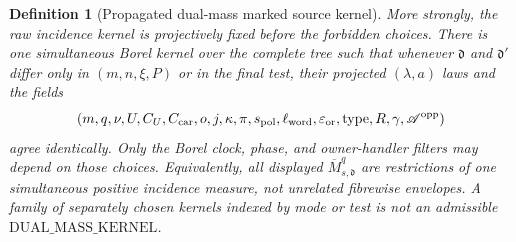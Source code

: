 \documentclass[11pt]{article}
\newtheorem{definition}[theorem]{Definition}
\begin{document}
\begin{definition}[Propagated dual-mass marked source kernel]
More strongly, the raw incidence kernel is projectively fixed before the
forbidden choices.  There is one simultaneous Borel kernel over the
complete tree such that whenever $\mathfrak d$ and $\mathfrak d'$ differ
only in $(m,n,\xi,P)$ or in the final test, their projected
$(\lambda,a)$ laws and the fields
\begin{equation}
\label{eq:source-kernel-projective-consistency}
 (m,q,\nu,U,C_U,C_{\rm car},o,j,\kappa,\pi,s_{\rm pol},
   \ell_{\rm word},\varepsilon_{\rm or},\operatorname{type},R,\gamma,
   \mathscr A^{\rm opp})
\end{equation}
agree identically.  Only the Borel clock, phase, and owner-handler filters
may depend on those choices.  Equivalently, all displayed
$\overline M_{s,\mathfrak d}^{q}$ are restrictions of one simultaneous
positive incidence measure, not unrelated fibrewise envelopes.  A family
of separately chosen kernels indexed by mode or test is not an admissible
$\mathrm{DUAL\_MASS\_KERNEL}$.


\end{definition}
\end{document}
